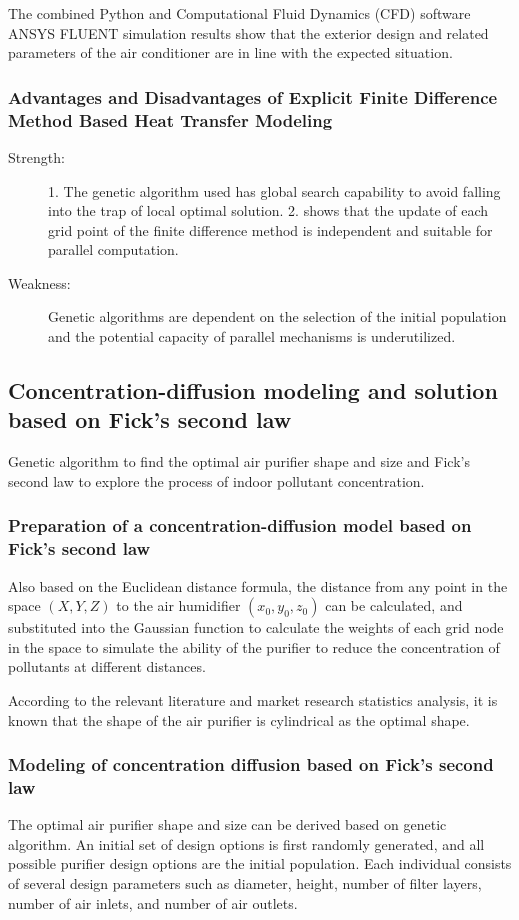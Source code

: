 \documentclass{apmcmthesis}
\begin{document}
The combined Python and Computational Fluid Dynamics (CFD) software ANSYS FLUENT simulation results show that the exterior design and related parameters of the air conditioner are in line with the expected situation.


\subsubsection{Advantages and Disadvantages of Explicit Finite Difference Method Based Heat Transfer Modeling}
\begin{description}
	\item[Strength:]1. The genetic algorithm used has global search capability to avoid falling into the trap of local optimal solution.
	2. shows that the update of each grid point of the finite difference method is independent and suitable for parallel computation.
	\item[Weakness:]  Genetic algorithms are dependent on the selection of the initial population and the potential capacity of parallel mechanisms is underutilized.
\end{description}
\subsection{Concentration-diffusion modeling and solution based on Fick's second law}
Genetic algorithm to find the optimal air purifier shape and size and Fick's second law to explore the process of indoor pollutant concentration.
\subsubsection{Preparation of a concentration-diffusion model based on Fick's second law}
Also based on the Euclidean distance formula, the distance from any point in the space $\left( {X,Y,Z} \right)$ to the air humidifier $\left( {{x_0},{y_0},{z_0}} \right)$ can be calculated, and substituted into the Gaussian function to calculate the weights of each grid node in the space to simulate the ability of the purifier to reduce the concentration of pollutants at different distances.

According to the relevant literature\cite{sadrizadeh2022indoor} and market research statistics analysis, it is known that the shape of the air purifier is cylindrical as the optimal shape.
\subsubsection{ Modeling of concentration diffusion based on Fick's second law}
The optimal air purifier shape and size can be derived based on genetic algorithm. An initial set of design options is first randomly generated, and all possible purifier design options are the initial population. Each individual consists of several design parameters such as diameter, height, number of filter layers, number of air inlets, and number of air outlets.
\end{document}
